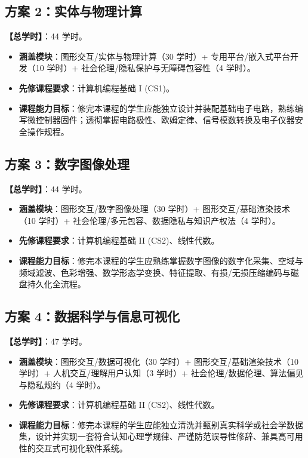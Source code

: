 \subsection{方案 2：实体与物理计算}
\textbf{【总学时】}：44 学时。
\begin{itemize}
    \item \textbf{涵盖模块}：图形交互/实体与物理计算（30 学时）+ 专用平台/嵌入式平台开发（10 学时）+ 社会伦理/隐私保护与无障碍包容性（4 学时）。
    \item \textbf{先修课程要求}：计算机编程基础 I (CS1)。
    \item \textbf{课程能力目标}：修完本课程的学生应能独立设计并装配基础电子电路，熟练编写微控制器固件；透彻掌握电路极性、欧姆定律、信号模数转换及电子仪器安全操作规程。
\end{itemize}

\subsection{方案 3：数字图像处理}
\textbf{【总学时】}：44 学时。
\begin{itemize}
    \item \textbf{涵盖模块}：图形交互/数字图像处理（30 学时）+ 图形交互/基础渲染技术（10 学时）+ 社会伦理/多元包容、数据隐私与知识产权法（4 学时）。
    \item \textbf{先修课程要求}：计算机编程基础 II (CS2)、线性代数。
    \item \textbf{课程能力目标}：修完本课程的学生应熟练掌握数字图像的数字化采集、空域与频域滤波、色彩增强、数学形态学变换、特征提取、有损/无损压缩编码与磁盘持久化全流程。
\end{itemize}

\subsection{方案 4：数据科学与信息可视化}
\textbf{【总学时】}：47 学时。
\begin{itemize}
    \item \textbf{涵盖模块}：图形交互/数据可视化（30 学时）+ 图形交互/基础渲染技术（10 学时）+ 人机交互/理解用户认知（3 学时）+ 社会伦理/数据伦理、算法偏见与隐私规约（4 学时）。
    \item \textbf{先修课程要求}：计算机编程基础 II (CS2)、线性代数。
    \item \textbf{课程能力目标}：修完本课程的学生应能独立清洗并甄别真实科学或社会学数据集，设计并实现一套符合认知心理学规律、严谨防范误导性修辞、兼具高可用性的交互式可视化软件系统。
\end{itemize}

